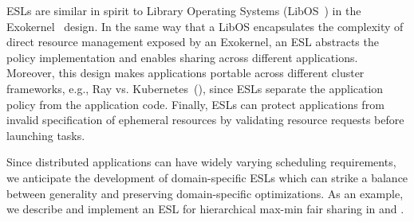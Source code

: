 ESLs are similar in spirit to Library Operating Systems (LibOS~\cite{Kaashoek:1997:APF:268998.266644}) in the Exokernel~\cite{exokernel} design.
In the same way that a LibOS encapsulates the complexity of direct resource management exposed by an Exokernel, an ESL abstracts the policy implementation and enables sharing across different applications.
Moreover, this design makes applications portable across different cluster frameworks, e.g., Ray vs. Kubernetes~(), since ESLs separate the application policy from the application code.
Finally, ESLs can protect applications from invalid specification of ephemeral resources by validating resource requests before launching tasks.

Since distributed applications can have widely varying scheduling requirements, we anticipate the development of domain-specific ESLs which can strike a balance between generality and preserving domain-specific optimizations. As an example, we describe and implement an ESL for hierarchical max-min fair sharing in  and . %



